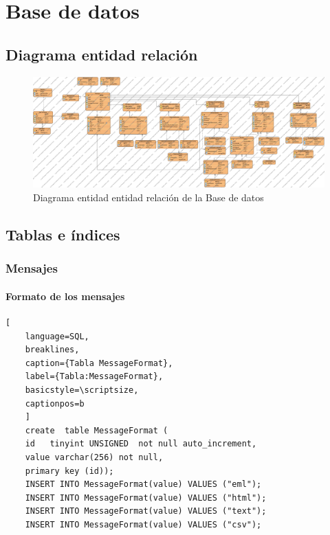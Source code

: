 \chapter{Base de datos}
\section{Diagrama entidad relación}


\begin{figure}[H]
    \centering
    \includegraphics[scale=0.2, angle=90]{imagenes/Diagrama_entidad_relacion.png}
\caption{Diagrama entidad entidad relación de la Base de datos}
\end{figure}



\section{Tablas e índices}
\renewcommand{\lstlistingname}{Tabla}%

\subsection{Mensajes}
\subsubsection{Formato de los mensajes}
\begin{lstlisting}[
    language=SQL,
    breaklines, 
    caption={Tabla MessageFormat}, 
    label={Tabla:MessageFormat}, 
    basicstyle=\scriptsize,
    captionpos=b
    ]
    create  table MessageFormat (
    id   tinyint UNSIGNED  not null auto_increment, 
    value varchar(256) not null, 
    primary key (id));
    INSERT INTO MessageFormat(value) VALUES ("eml");
    INSERT INTO MessageFormat(value) VALUES ("html");
    INSERT INTO MessageFormat(value) VALUES ("text");
    INSERT INTO MessageFormat(value) VALUES ("csv");
\end{lstlisting}

